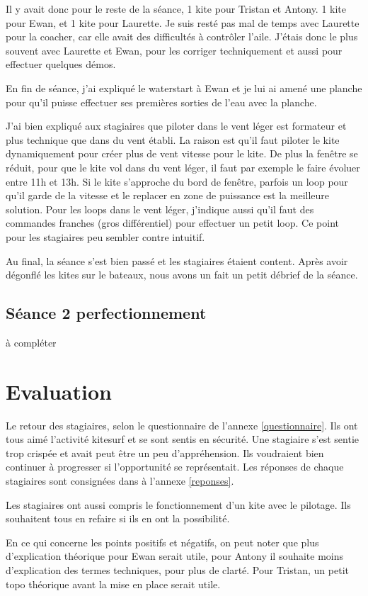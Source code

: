 \documentclass[11pt,a4paper]{report}
\begin{document}
Il y avait donc pour le reste de la séance, 1 kite pour Tristan et Antony.
1 kite pour Ewan, et 1 kite pour Laurette. Je suis resté pas mal de temps
avec Laurette pour la coacher, car elle avait des difficultés à contrôler l'aile.
J'étais donc le plus souvent avec Laurette et Ewan, pour les corriger techniquement 
et aussi pour effectuer quelques démos.

En fin de séance, j'ai expliqué le waterstart à Ewan et je lui ai
amené une planche pour qu'il puisse effectuer ses premières sorties
de l'eau avec la planche.

J'ai bien expliqué aux stagiaires que piloter dans le vent léger est
formateur et plus technique que dans du vent établi. La raison est qu'il faut
piloter le kite dynamiquement pour créer plus de vent vitesse pour le kite.
De plus la fen\^etre se réduit, pour que le kite vol dans du vent léger, 
il faut par exemple le faire évoluer entre 11h et 13h. Si le kite s'approche du 
bord de fen\^etre, parfois un loop pour qu'il garde de la vitesse et le replacer
en zone de puissance est la meilleure solution.
Pour les loops dans le vent léger, j'indique aussi qu'il faut
des commandes franches (gros différentiel) pour effectuer un petit loop.
Ce point pour les stagiaires peu sembler contre intuitif.

Au final, la séance s'est bien passé et les stagiaires étaient content.
Après avoir dégonflé les kites sur le bateaux, nous avons un fait un
petit débrief de la séance.

\subsection{Séance 2 perfectionnement}
à compléter
\section{Evaluation}
Le retour des stagiaires, selon le questionnaire de l'annexe \ref{questionnaire}.
Ils ont tous aimé l'activité kitesurf et se sont sentis en sécurité.
Une stagiaire s'est sentie trop crispée et avait peut \^etre un peu d'appréhension.
Ils  voudraient bien continuer à progresser si l'opportunité se représentait.
Les réponses de chaque stagiaires sont consignées dans à l'annexe \ref{reponses}.

Les stagiaires ont aussi compris le fonctionnement d'un kite avec le pilotage.
Ils souhaitent tous en refaire si ils en ont la possibilité.

En ce qui concerne les points positifs et négatifs, on peut noter
que plus d'explication théorique pour Ewan serait utile, pour Antony
il souhaite moins d'explication des termes techniques, pour plus de clarté.
Pour Tristan, un petit topo théorique avant la mise en place serait utile.
\end{document}
